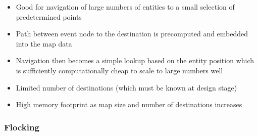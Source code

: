 \documentclass[a4paper]{article}
\begin{document}
\begin{itemize}
  \item
    Good for navigation of large numbers of entities to a small selection of
    predetermined points

  \item
    Path between event node to the destination is precomputed and embedded into
    the map data

  \item
    Navigation then becomes a simple lookup based on the entity position which
    is sufficiently computationally cheap to scale to large numbers well

  \item
    Limited number of destinations (which must be known at design stage)

  \item
    High memory footprint as map size and number of destinations increases

\end{itemize}

\subsubsection{Flocking}
\end{document}
